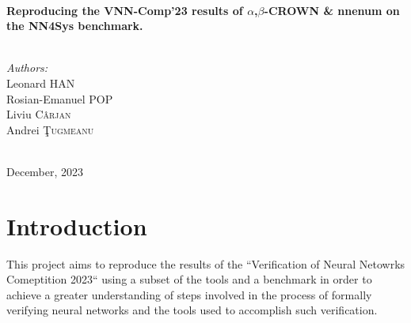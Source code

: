 \documentclass[12pt]{report}
\begin{document}
\begin{titlepage}
\HRule \\[0.4cm]
{ \large \bfseries Reproducing the VNN-Comp'23 results of $\alpha$,$\beta$-CROWN \& nnenum on the NN4Sys benchmark.}\\[0.4cm] %
\HRule \\[1.5cm]
 

\begin{minipage}{0.4\textwidth}
\begin{flushleft} \large
\emph{Authors:}\\
Leonard \textsc{HAN}\\ 
Rosian-Emanuel \textsc{POP}\\ 
Liviu \textsc{C\^{a}rjan}\\ 
Andrei \textsc{\c{T}ugmeanu}\\ 
\end{flushleft}

\end{minipage}\\[2cm]



{\large December, 2023}\\[2cm] %

\vfill %

\end{titlepage}
\section{Introduction}
This project aims to reproduce the results of the ``Verification of Neural Netowrks Comeptition 2023`` using a subset of the tools and a benchmark in order to achieve a greater understanding of steps involved in the process of formally verifying neural networks and the tools used to accomplish such verification.
\end{document}
